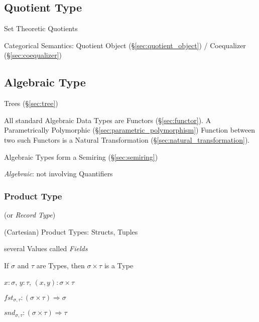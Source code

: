 


\subsection{Quotient Type}\label{sec:quotient_type}\hfill

Set Theoretic Quotients

Categorical Semantics: Quotient Object (\S\ref{sec:quotient_object}) /
Coequalizer (\S\ref{sec:coequalizer})



\subsection{Algebraic Type}\label{sec:algebraic_type}

Trees (\S\ref{sec:tree})

All standard Algebraic Data Types are Functors (\S\ref{sec:functor}).
A Parametrically Polymorphic (\S\ref{sec:parametric_polymorphism})
Function between two such Functors is a Natural Transformation
(\S\ref{sec:natural_transformation}).

Algebraic Types form a Semiring (\S\ref{sec:semiring})

\emph{Algebraic}: not involving Quantifiers %



\subsubsection{Product Type}\label{sec:product_type}

(or \emph{Record Type})

(Cartesian) Product Types: Structs, Tuples

several Values called \emph{Fields}

If $\sigma$ and $\tau$ are Types, then $\sigma \times \tau$ is a Type

$x : \sigma$, $y : \tau$, $(x,y) : \sigma \times \tau$

$fst_{\sigma,\tau} : (\sigma \times \tau) \Rightarrow \sigma$

$snd_{\sigma,\tau} : (\sigma \times \tau) \Rightarrow \tau$

